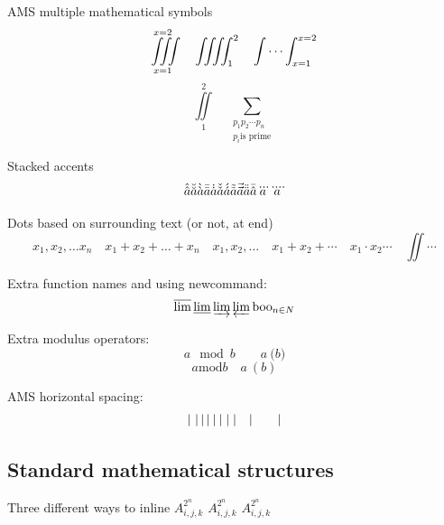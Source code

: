 \documentclass[12pt,a4paper]{article}
\theoremstyle{clearprint}
\newcommand{\boo}{\mathrm{boo}}
\begin{document}
\noindent
AMS multiple mathematical symbols
\begin{equation}
\iiint\limits_{x=1}^{x=2} \quad \iiiint_1^2 \quad \idotsint_{x=1}^{x=2} 
\end{equation}
\begin{equation}
\iint\limits_1^2 \quad  \sum_{\substack{p_1p_2\cdots p_{n}\\p_i \text{is prime}}}
\end{equation}

\noindent
Stacked accents
\begin{equation}
\Hat{\Hat{a}} \Breve{\Breve{a}} \Grave{\Grave{a}} \Bar{\Bar{a}} \Dot{\Dot{a}} \Check{\Check{a}} \Acute{\Acute{a}} \Tilde{\Tilde{a}} \Vec{\Vec{a}} \Ddot{\Ddot{a}} \Bar{\Hat{a}} \dddot{a} \ddddot{a}
\end{equation}

\noindent
Dots based on surrounding text (or not, at end)
\begin{equation}
x_1, x_2, \dots x_n \quad x_1 + x_2 + \dots + x_n \quad x_1,x_2, \dotsc \quad x_1 + x_2 + \dotsb \quad x_1 \cdot x_2 \dotsm \quad \iint \dotsi
\end{equation}

\noindent 
Extra function names and using newcommand:
\begin{equation}
\varlimsup \varliminf \varinjlim \varprojlim \boo_{n \in N} %
\end{equation}

\noindent 
Extra modulus operators:
\begin{equation}
a \mod{b} \qquad a \pod{b}
\end{equation}
\begin{equation}
a \mathrm{mod} b \quad a \: (b)
\end{equation}

\noindent 
AMS horizontal spacing:
\begin{equation}
|~|\thinspace|\,|\medspace|\:|\thickspace|\;|\quad | \qquad |
\end{equation}

\subsection[Maths structures]{Standard mathematical structures}
\setcounter{equation}{0}

\noindent 
Three different ways to inline \begin{math}A_{i,j,k}^{2^n}\end{math} \(A_{i,j,k}^{2^n}\) $A_{i,j,k}^{2^n}$
\end{document}
